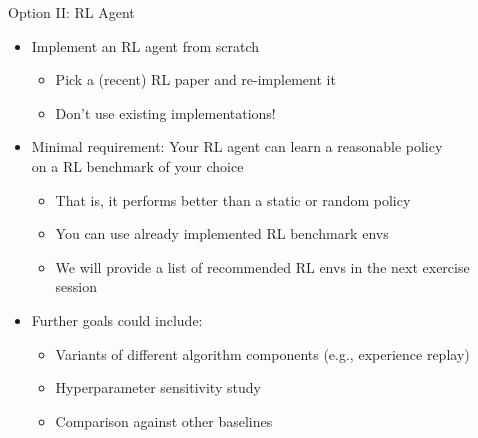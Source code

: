 \documentclass[aspectratio=169]{../latex_main/tntbeamer}  %
\begin{document}
\begin{frame}[c]{Option II: RL Agent}
	
	\begin{itemize}
		\item Implement an RL agent from scratch
		\begin{itemize}
		    \item Pick a (recent) RL paper and re-implement it
			\item Don't use existing implementations!
		\end{itemize}
		\item Minimal requirement: Your RL agent can learn a reasonable policy\\ on a RL benchmark of your choice
		\begin{itemize}
			\item That is, it performs better than a static or random policy
			\item You can use already implemented RL benchmark envs
			\item We will provide a list of recommended RL envs in the next exercise session
		\end{itemize}
		\item Further goals could include:
		\begin{itemize}
			\item Variants of different algorithm components (e.g., experience replay)
			\item Hyperparameter sensitivity study
			\item Comparison against other baselines
		\end{itemize}
	\end{itemize}
	
\end{frame}
\end{document}
